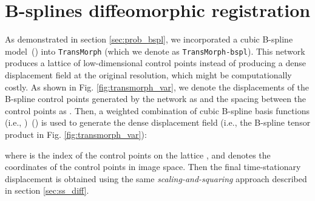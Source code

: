 \documentclass[times,twocolumn,final]{elsarticle}
\begin{document}
\section{B-splines diffeomorphic registration}
\label{sec:bspline_diff}
As demonstrated in section \ref{sec:prob_bspl}, we incorporated a cubic B-spline model~(\cite{qiu2021learning}) into \texttt{TransMorph} (which we denote as \texttt{TransMorph-bspl}). This network produces a lattice of low-dimensional control points instead of producing a dense displacement field at the original resolution, which might be computationally costly. As shown in Fig. \ref{fig:transmorph_var}, we denote the displacements of the B-spline control points generated by the network as  and the spacing between the control points as . Then, a weighted combination of cubic B-spline basis functions (i.e., )~(\cite{rueckert1999nonrigid}) is used to generate the dense displacement field (i.e., the B-spline tensor product in Fig. \ref{fig:transmorph_var}):
\begin{linenomath}

\end{linenomath}
where  is the index of the control points on the lattice , and  denotes the coordinates of the control points  in image space. Then the final time-stationary displacement  is obtained using the same \textit{scaling-and-squaring} approach described in section \ref{sec:ss_diff}.

\begin{comment}
\section{Bayesian uncertainty estimation}
\label{sec:bayesian_uncert}
Given a training dataset of moving and fixed images , where  represents the moving images, the corresponding target images is denoted by , and  is the number of image pairs. We aim to find the predictive distribution of the form , which can be computed as:
\begin{linenomath}

\end{linenomath}
where  denotes the weight matrices in the Transformer encoder. However, this integral over  is computationally intractable since one would need to sample a large number of networks with various configurations of the parameters to get an accurate estimate of the predictive distribution. Since the distribution  cannot be evaluated analytically, we define a variational distribution  that follows a Bernoulli distribution:
\begin{linenomath}
\label{eqn:drop_prob}

\end{linenomath}
where  is the  weight,  is chosen so that the dimensions of  and  are matched, and  is the probability that . It has been shown in~(\cite{gal2016dropout}) that ELBO maximization may be accomplished via training and inferencing with dropout~(\cite{srivastava2014dropout}).
\end{comment}
 \clearpage
\twocolumn
\typeout{}





\clearpage
\end{document}
